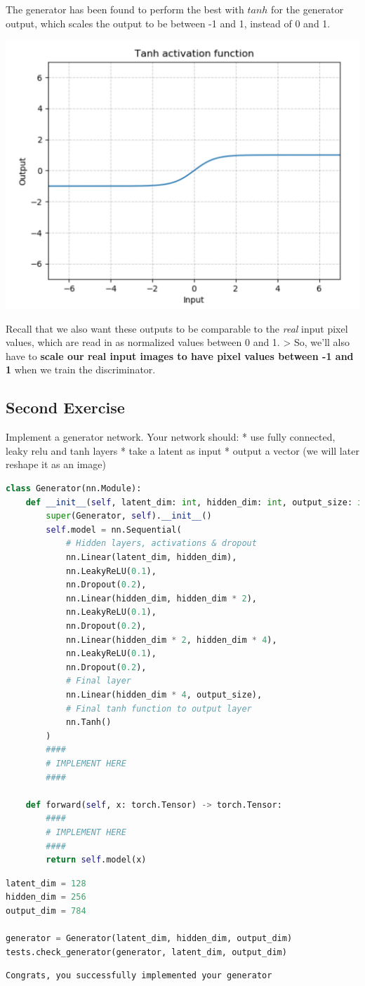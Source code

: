 The generator has been found to perform the best with \(tanh\) for the
generator output, which scales the output to be between -1 and 1,
instead of 0 and 1.

\includegraphics[width=0.5\linewidth]{img//genAdvNet//gan/tanh_fn.png}

Recall that we also want these outputs to be comparable to the
\emph{real} input pixel values, which are read in as normalized values
between 0 and 1. \textgreater{} So, we'll also have to \textbf{scale our
real input images to have pixel values between -1 and 1} when we train
the discriminator.

\subsection{Second Exercise}\label{second-exercise}

Implement a generator network. Your network should: * use fully
connected, leaky relu and tanh layers * take a latent as input * output
a vector (we will later reshape it as an image)

\begin{lstlisting}[language=Python]
class Generator(nn.Module):
    def __init__(self, latent_dim: int, hidden_dim: int, output_size: int):
        super(Generator, self).__init__()
        self.model = nn.Sequential(
            # Hidden layers, activations & dropout
            nn.Linear(latent_dim, hidden_dim),
            nn.LeakyReLU(0.1),
            nn.Dropout(0.2),
            nn.Linear(hidden_dim, hidden_dim * 2),
            nn.LeakyReLU(0.1),
            nn.Dropout(0.2),
            nn.Linear(hidden_dim * 2, hidden_dim * 4),
            nn.LeakyReLU(0.1),
            nn.Dropout(0.2),
            # Final layer
            nn.Linear(hidden_dim * 4, output_size),
            # Final tanh function to output layer
            nn.Tanh()
        )
        #### 
        # IMPLEMENT HERE
        ####

    def forward(self, x: torch.Tensor) -> torch.Tensor:
        #### 
        # IMPLEMENT HERE
        ####
        return self.model(x)
\end{lstlisting}

\begin{lstlisting}[language=Python]
latent_dim = 128
hidden_dim = 256
output_dim = 784

generator = Generator(latent_dim, hidden_dim, output_dim)
tests.check_generator(generator, latent_dim, output_dim)
\end{lstlisting}

\begin{lstlisting}
Congrats, you successfully implemented your generator
\end{lstlisting}
